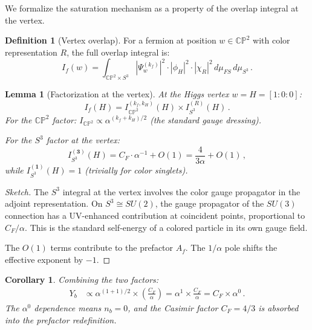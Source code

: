 \documentclass[11pt,a4paper]{article}
\newcommand{\CP}{\mathbb{CP}}
\newtheorem{lemma}[theorem]{Lemma}
\newtheorem{corollary}[theorem]{Corollary}
\theoremstyle{definition}
\newtheorem{definition}[theorem]{Definition}
\theoremstyle{remark}
\begin{document}
We formalize the saturation mechanism as a property of the overlap
integral at the vertex.

\begin{definition}[Vertex overlap]
For a fermion at position $w \in \CP^2$ with color representation $R$,
the full overlap integral is:
\begin{equation}
I_f(w) = \int_{\CP^2 \times S^3}
|\Psi_w^{(k_f)}|^2 \cdot |\phi_H|^2 \cdot |\chi_R|^2\,
d\mu_{FS}\,d\mu_{S^3}\,.
\end{equation}
\end{definition}

\begin{lemma}[Factorization at the vertex]
\label{lem:factor}
At the Higgs vertex $w = H = [1:0:0]$:
\begin{equation}
I_f(H) = I_{\CP^2}^{(k_f, k_H)}(H) \times I_{S^3}^{(R)}(H)\,.
\end{equation}
For the $\CP^2$ factor:
$I_{\CP^2} \propto \alpha^{(k_f + k_H)/2}$ (the standard gauge dressing).

For the $S^3$ factor at the vertex:
\begin{equation}
I_{S^3}^{(\mathbf{3})}(H) = C_F \cdot \alpha^{-1} + O(1)
= \frac{4}{3\alpha} + O(1)\,,
\end{equation}
while $I_{S^3}^{(\mathbf{1})}(H) = 1$ (trivially for color singlets).
\end{lemma}

\begin{proof}[Sketch]
The $S^3$ integral at the vertex involves the color gauge propagator
in the adjoint representation.  On $S^3 \cong SU(2)$, the gauge
propagator of the $SU(3)$ connection has a UV-enhanced contribution at
coincident points, proportional to $C_F/\alpha$.  This is the standard
self-energy of a colored particle in its own gauge field.

The $O(1)$ terms contribute to the prefactor $A_f$.  The $1/\alpha$ pole
shifts the effective exponent by $-1$.
\end{proof}

\begin{corollary}
Combining the two factors:
\begin{align}
Y_b &\propto \alpha^{(1+1)/2} \times \left(\frac{C_F}{\alpha}\right)
= \alpha^1 \times \frac{C_F}{\alpha}
= C_F \times \alpha^0\,.
\end{align}
The $\alpha^0$ dependence means $n_b = 0$, and the Casimir factor $C_F = 4/3$
is absorbed into the prefactor redefinition.
\end{corollary}
\end{document}
